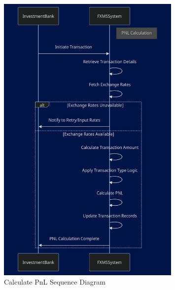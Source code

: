 \documentclass[a4paper]{report}
\begin{document}
\begin{figure}[h!]
    \centering
    \includegraphics[width=0.8\textwidth]{images/sequence2.png}
    \caption{Calculate PnL Sequence Diagram}
    \label{fig:sequence2}
\end{figure}
\end{document}
